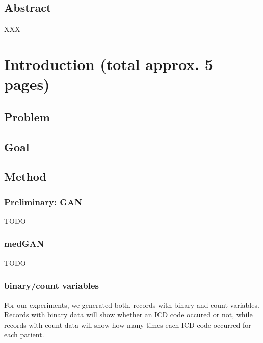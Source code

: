 \documentclass[11pt, a4paper]{book}
\def\blankpage{%
      \clearpage%
      \thispagestyle{empty}%
      \addtocounter{page}{-1}%
      \null%
      \clearpage}
\begin{document}
\pagestyle{fancy}
\thispagestyle{empty}
\renewcommand{\bibname}{References}

\renewcommand\theadfont{\normalsize}

\thispagestyle{empty}
\maketitle

\blankpage

\thispagestyle{empty}
\section*{Abstract}
XXX


\blankpage

\clearpage

\thispagestyle{empty}
\tableofcontents

\blankpage







\chapter{Introduction (total approx. 5 pages)}

\section{Problem}
\section{Goal}

\section{Method}
\subsection{Preliminary: GAN}
TODO
\subsection{medGAN}
TODO
\subsection{binary/count variables}
For our experiments, we generated both, records with binary and count variables. Records with binary data will show whether an ICD code occured or not, while records with count data will show how many times each ICD code occurred for each patient.
\end{document}

